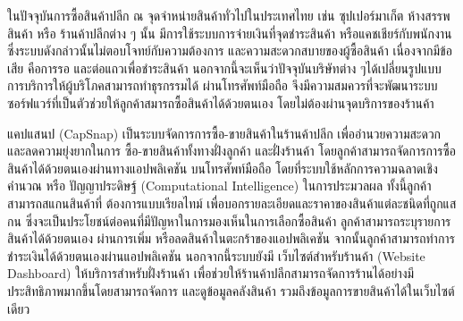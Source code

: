 \maketitle
\makesignature

\ifproject
  \begin{abstractTH}
    \enskip ในปัจจุบันการซื้อสินค้าปลีก ณ จุดจำหน่ายสินค้าทั่วไปในประเทศไทย เช่น ซุปเปอร์มาเก็ต ห้างสรรพสินค้า หรือ ร้านค้าปลีกต่าง ๆ นั้น
    มีการใช้ระบบการจ่ายเงินที่จุดชำระสินค้า หรือแคชเชียร์กับพนักงาน ซึ่งระบบดังกล่าวนั้นไม่ตอบโจทย์กับความต้องการ และความสะดวกสบายของผู้ซื้อสินค้า
    เนื่องจากมีข้อเสีย คือการรอ และต่อแถวเพื่อชำระสินค้า  นอกจากนี้จะเห็นว่าปัจจุบันบริษัทต่าง ๆได้เปลี่ยนรูปแบบการบริการให้ผู้บริโภคสามารถทำธุรกรรมได้
    ผ่านโทรศัพท์มือถือ จึงมีความสมควรที่จะพัฒนาระบบซอร์ฟแวร์ที่เป็นตัวช่วยให้ลูกค้าสมารถซื้อสินค้าได้ด้วยตนเอง โดยไม่ต้องผ่านจุดบริการของร้านค้า

    \enskip    แคปแสนป (CapSnap) เป็นระบบจัดการการซื้อ-ขายสินค้าในร้านค้าปลีก เพื่ออำนวยความสะดวก และลดความยุ่งยากในการ
    ซื้อ-ขายสินค้าทั้งทางฝั่งลูกค้า และฝั่งร้านค้า โดยลูกค้าสามารถจัดการการซื้อสินค้าได้ด้วยตนเองผ่านทางแอปพลิเคชัน
    บนโทรศัพท์มือถือ โดยที่ระบบใช้หลักการความฉลาดเชิงคำนวณ หรือ ปัญญาประดิษฐ์ (Computational Intelligence) ในการประมวลผล ทั้งนี้ลูกค้าสามารถสแกนสินค้าที่
    ต้องการแบบเรียลไทม์ เพื่อบอกรายละเอียดและราคาของสินค้าแต่ละชนิดที่ถูกแสกน
    \enskip ซึ่งจะเป็นประโยชน์ต่อคนที่มีปัญหาในการมองเห็นในการเลือกซื้อสินค้า ลูกค้าสามารถระบุรายการสินค้าได้ด้วยตนเอง
    ผ่านการเพิ่ม หรือลดสินค้าในตะกร้าของแอปพลิเคชัน จากนั้นลูกค้าสามารถทําการชําระเงินได้ด้วยตนเองผ่านแอปพลิเคชัน นอกจากนี้ระบบยังมี
    \enskip เว็บไซต์สำหรับร้านค้า (Website Dashboard) ให้บริการสําหรับฝั่งร้านค้า เพื่อช่วยให้ร้านค้าปลีกสามารถจัดการร้านได้อย่างมีประสิทธิภาพมากขึ้นโดยสามารถจัดการ
    และดูข้อมูลคลังสินค้า รวมถึงข้อมูลการขายสินค้าได้ในเว็บไซต์เดียว

  \end{abstractTH}

